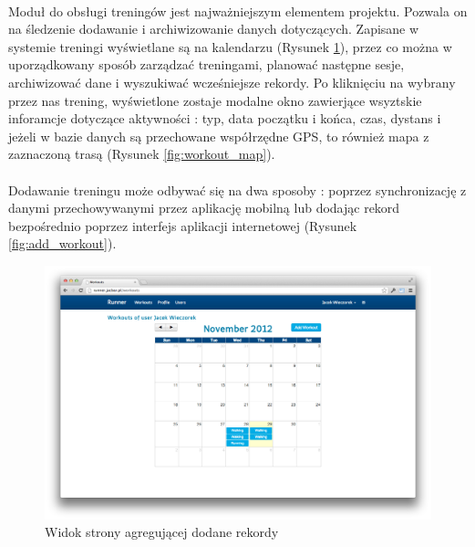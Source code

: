 \paragraph{}
Moduł do obsługi treningów jest najważniejszym elementem projektu. Pozwala on na śledzenie dodawanie i archiwizowanie danych dotyczących. Zapisane w systemie treningi wyświetlane są na kalendarzu (Rysunek \ref{fig:workout_main}), przez co można w uporządkowany sposób zarządzać treningami, planować następne sesje, archiwizować dane i wyszukiwać wcześniejsze rekordy. Po kliknięciu na wybrany przez nas trening, wyświetlone zostaje modalne okno zawierjące wsyztskie inforamcje dotyczące aktywności : typ, data początku i końca, czas, dystans i jeżeli w bazie danych są przechowane współrzędne GPS, to również mapa z zaznaczoną trasą (Rysunek \ref{fig:workout_map}).
\paragraph{} %
\label{par:}

 Dodawanie treningu może odbywać się na dwa sposoby : poprzez synchronizację z danymi przechowywanymi przez aplikację mobilną lub dodając rekord bezpośrednio poprzez interfejs aplikacji internetowej (Rysunek \ref{fig:add_workout}).


\begin{figure}[ht]
	\centering
		\includegraphics[width=1\linewidth]{assets/workouts_main.png}
	\caption{Widok strony agregującej dodane rekordy}
	\label{fig:workout_main}
\end{figure}

